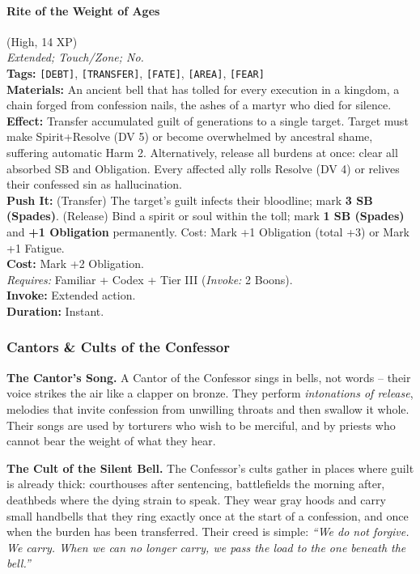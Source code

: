 \paragraph{Rite of the Weight of Ages} (High, 14 XP) \hfill \\
\emph{Extended; Touch/Zone; No.} \\
\textbf{Tags:} \texttt{[DEBT]}, \texttt{[TRANSFER]}, \texttt{[FATE]}, \texttt{[AREA]}, \texttt{[FEAR]} \\
\textbf{Materials:} An ancient bell that has tolled for every execution in a kingdom, a chain forged from confession nails, the ashes of a martyr who died for silence. \\
\textbf{Effect:} Transfer accumulated guilt of generations to a single target. Target must make Spirit+Resolve (DV 5) or become overwhelmed by ancestral shame, suffering automatic Harm 2. Alternatively, release all burdens at once: clear all absorbed SB and Obligation. Every affected ally rolls Resolve (DV 4) or relives their confessed sin as hallucination. \\
\textbf{Push It:} (Transfer) The target's guilt infects their bloodline; mark \textbf{3 SB (Spades)}. (Release) Bind a spirit or soul within the toll; mark \textbf{1 SB (Spades)} and \textbf{+1 Obligation} permanently. Cost: Mark +1 Obligation (total +3) or Mark +1 Fatigue. \\
\textbf{Cost:} Mark +2 Obligation. \\
\textit{Requires:} Familiar + Codex + Tier III (\textit{Invoke:} 2 Boons). \\
\textbf{Invoke:} Extended action. \\
\textbf{Duration:} Instant.

\subsubsection*{Cantors \& Cults of the Confessor}

\textbf{The Cantor's Song.} A Cantor of the Confessor sings in bells, not words -- their voice strikes the air like a clapper on bronze. They perform \textit{intonations of release}, melodies that invite confession from unwilling throats and then swallow it whole. Their songs are used by torturers who wish to be merciful, and by priests who cannot bear the weight of what they hear.

\textbf{The Cult of the Silent Bell.} The Confessor's cults gather in places where guilt is already thick: courthouses after sentencing, battlefields the morning after, deathbeds where the dying strain to speak. They wear gray hoods and carry small handbells that they ring exactly once at the start of a confession, and once when the burden has been transferred. Their creed is simple: \textit{``We do not forgive. We carry. When we can no longer carry, we pass the load to the one beneath the bell.''}

